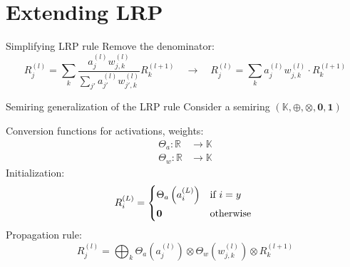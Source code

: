 \documentclass[aspectratio=169]{beamer}
\theoremstyle{definition}
\begin{document}
\section{Extending LRP}
\begin{frame}{Simplifying LRP rule}
    Remove the denominator:
    \begin{equation*}
        R^{(l)}_j = \sum_k\frac{a^{(l)}_jw_{j, k}^{(l)}}{\sum_{j'}a^{(l)}_{j'}w_{j', k}^{(l)}} R^{(l+1)}_k \quad \longrightarrow \quad R^{(l)}_j = \sum_{k} a^{(l)}_jw_{j, k}^{(l)} \cdot R^{(l+1)}_k
    \end{equation*}
\end{frame}

\begin{frame}{Semiring generalization of the LRP rule}
    Consider a semiring $(\mathbb{K}, \oplus, \otimes, \mathbf{0}, \mathbf{1})$

    Conversion functions for activations, weights:
    \begin{equation*}
        \begin{aligned}
            \Theta_a : \mathbb{R} &\longrightarrow \mathbb{K}\\
            \Theta_w : \mathbb{R} &\longrightarrow \mathbb{K}
        \end{aligned}
    \end{equation*}
    Initialization:
    \begin{equation}
        R^{(L)}_i = \begin{cases*}
            \Theta_a\left(a^{(L)}_i\right) & if $i = y$\\
            \mathbf{0} & otherwise
        \end{cases*}
    \end{equation}
    Propagation rule:
    \begin{equation}
        R^{(l)}_j = \bigoplus_k \Theta_a\left(a^{(l)}_j\right) \otimes \Theta_w\left(w_{j, k}^{(l)}\right) \otimes R^{(l+1)}_k
    \end{equation}
\end{frame}
\end{document}

